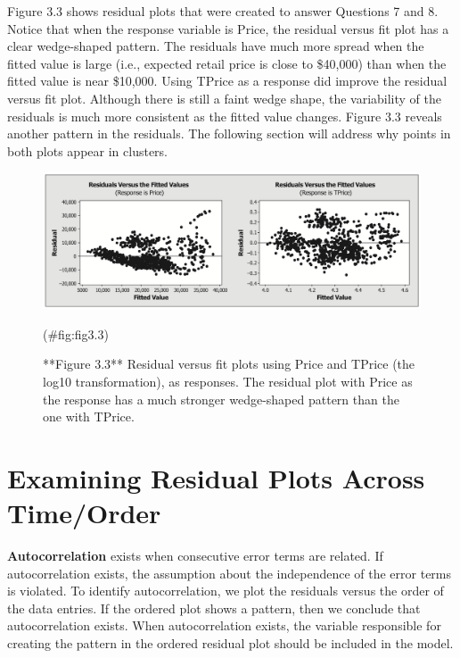 \documentclass[
]{report}
\begin{document}
Figure 3.3 shows residual plots that were created to answer Questions 7 and 8. Notice that when the response variable is Price, the residual versus fit plot has a clear wedge-shaped pattern. The residuals have much more spread when the fitted value is large (i.e., expected retail price is close to \$40,000) than when the fitted value is near \$10,000. Using TPrice as a response did improve the residual versus fit plot. Although
there is still a faint wedge shape, the variability of the residuals is much more consistent as the fitted value changes. Figure 3.3 reveals another pattern in the residuals. The following section will address why points in both plots appear in clusters.

\begin{figure}

{\centering \includegraphics[width=1\linewidth]{docs/Fig3_3} 

}

\caption{**Figure 3.3** Residual versus fit plots using Price and TPrice (the log10 transformation), as responses. The residual plot with Price as the response has a much stronger wedge-shaped pattern than the one with TPrice.}(\#fig:fig3.3)
\end{figure}

\section*{Examining Residual Plots Across Time/Order}\label{examining-residual-plots-across-timeorder}

\textbf{Autocorrelation} exists when consecutive error terms are related. If autocorrelation exists, the assumption about the independence of the error terms is violated. To identify autocorrelation, we plot the residuals versus the order of the data entries. If the ordered plot shows a pattern, then we conclude that autocorrelation exists. When autocorrelation exists, the variable responsible for creating the pattern in the ordered residual plot should be included in the model.
\end{document}

